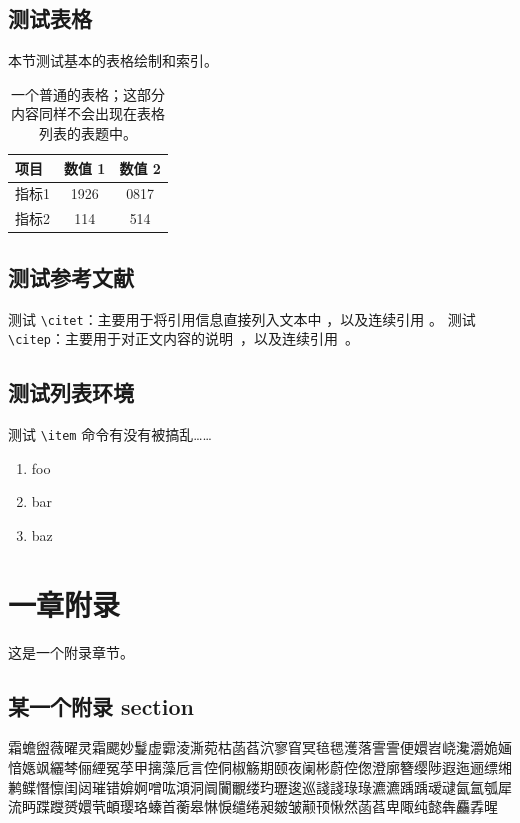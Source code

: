 \documentclass[
  fontset = mac,
]{shtthesis}
\begin{document}
\section{测试表格}
本节测试基本的表格绘制和索引。

\begin{table}[htb]
  \centering
  \caption[一个普通的表格]{一个普通的表格；这部分内容同样不会出现在表格列表的表题中。}
  \begin{tabular}{lcc}
    \hline
    项目 & 数值 1 & 数值 2 \\
    \hline
    指标1 & 1926 & 0817 \\
    指标2 & 114  & 514 \\
    \hline
  \end{tabular}
\end{table}

\section{测试参考文献}
测试 \verb|\citet|：主要用于将引用信息直接列入文本中 \citet{wikibook2014latex}，以及连续引用 \citet{lamport1986document, chen2005zhulu}。
测试 \verb|\citep|：主要用于对正文内容的说明~\citep{chu2004tushu}，以及连续引用~\citep{stamerjohanns2009mathml, betts2005aging}。

\section{测试列表环境}
测试 \verb|\item| 命令有没有被搞乱……
\begin{enumerate}
  \item foo
  \item bar
  \item baz
\end{enumerate}

\makebiblio

\appendix
\chapter{一章附录}
这是一个附录章节。

\section{某一个附录 section}
{\songti 霜蟾盥薇曜灵霜颸妙鬘虚霩淩澌菀枯菡萏泬寥窅冥毰毸濩落霅霅便嬛岧峣瀺灂姽婳愔嫕飒纚棽俪緸冤莩甲摛藻卮言倥侗椒觞期颐夜阑彬蔚倥偬澄廓簪缨陟遐迤逦缥缃鹣鲽憯懔闺闼璀错媕婀噌吰澒洞阛闠覼缕玓瓑逡巡諓諓琭琭瀌瀌踽踽叆叇氤氲瓠犀流眄蹀躞赟嬛茕頔璎珞螓首蘅皋惏悷缱绻昶皴皱颟顸愀然菡萏卑陬纯懿犇麤掱暒}
\end{document}
